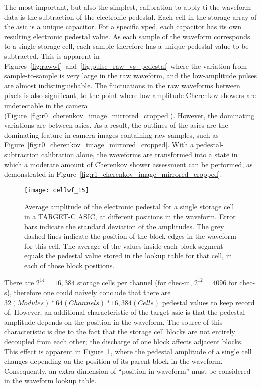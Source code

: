 The most important, but also the simplest, calibration to apply ti the waveform data is the subtraction of the electronic pedestal. Each cell in the storage array of the \gls{asic} is a unique capacitor. For a specific \gls{vped}, each capacitor has its own resulting electronic pedestal value. As each sample of the waveform corresponds to a single storage cell, each sample therefore has a unique pedestal value to be subtracted. This is apparent in Figures~\ref{fig:rawwf}~and~\ref{fig:pulse_raw_vs_pedestal} where the variation from sample-to-sample is very large in the raw waveform, and the low-amplitude pulses are almost indistinguishable. The fluctuations in the raw waveforms between pixels is also significant, to the point where low-amplitude Cherenkov showers are undetectable in the camera (Figure~\ref{fig:r0_cherenkov_image_mirrored_cropped}). However, the dominating variations are between \glspl{asic}. As a result, the outlines of the \glspl{asic} are the dominating feature in camera images containing raw samples, such as Figure~\ref{fig:r0_cherenkov_image_mirrored_cropped}. With a pedestal-subtraction calibration alone, the waveforms are transformed into a state in which a moderate amount of Cherenkov shower assessment can be performed, as demonstrated in Figure~\ref{fig:r1_cherenkov_image_mirrored_cropped}.

\begin{figure}
	\centering
    \texttt{[image: cellwf\_15]} 
	\caption[Storage-cell-amplitude dependence on position in the waveform.]{Average amplitude of the electronic pedestal for a single storage cell in a TARGET-C ASIC, at different positions in the waveform. Error bars indicate the standard deviation of the amplitudes. The grey dashed lines indicate the position of the block edges in the waveform for this cell. The average of the values inside each block segment equals the pedestal value stored in the lookup table for that cell, in each of those block positions.} 
	\label{fig:cellwf}
\end{figure}

There are $2^{14} = 16,384$ storage cells per channel (for \gls{chec-m}, $2^{12} = 4096$ for \gls{chec-s}), therefore one could naively conclude that there are $32 (Modules) * 64 (Channels) * 16,384 (Cells)$ pedestal values to keep record of. However, an additional characteristic of the \gls{target} \gls{asic} is that the pedestal amplitude depends on the position in the waveform. The source of this characteristic is due to the fact that the storage cell blocks are not entirely decoupled from each other; the discharge of one block affects adjacent blocks. This effect is apparent in Figure~\ref{fig:cellwf}, where the pedestal amplitude of a single cell changes depending on the position of its parent block in the waveform. Consequently, an extra dimension of ``position in waveform'' must be considered in the waveform lookup table.

